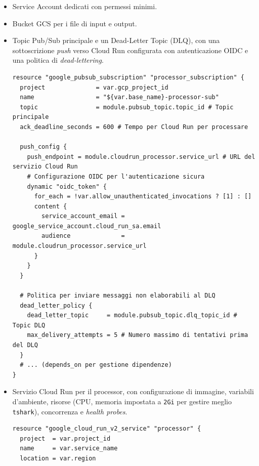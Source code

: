 \documentclass[11pt, a4paper]{article}
\begin{document}
\begin{itemize}
    \item Service Account dedicati con permessi minimi.
    \item Bucket GCS per i file di input e output.
    \item Topic Pub/Sub principale e un Dead-Letter Topic (DLQ), con una sottoscrizione \textit{push} verso Cloud Run configurata con autenticazione OIDC e una politica di \textit{dead-lettering}.
    \begin{lstlisting}[language=HCL, style=hclstyle, caption={Estratto da \texttt{terraform/main.tf}: Definizione della sottoscrizione Pub/Sub.}, label=lst:tf_pubsub_sub, basicstyle=\ttfamily\scriptsize]
resource "google_pubsub_subscription" "processor_subscription" {
  project              = var.gcp_project_id
  name                 = "${var.base_name}-processor-sub"
  topic                = module.pubsub_topic.topic_id # Topic principale
  ack_deadline_seconds = 600 # Tempo per Cloud Run per processare

  push_config {
    push_endpoint = module.cloudrun_processor.service_url # URL del servizio Cloud Run
    # Configurazione OIDC per l'autenticazione sicura
    dynamic "oidc_token" {
      for_each = !var.allow_unauthenticated_invocations ? [1] : []
      content {
        service_account_email = google_service_account.cloud_run_sa.email
        audience              = module.cloudrun_processor.service_url
      }
    }
  }

  # Politica per inviare messaggi non elaborabili al DLQ
  dead_letter_policy {
    dead_letter_topic     = module.pubsub_topic.dlq_topic_id # Topic DLQ
    max_delivery_attempts = 5 # Numero massimo di tentativi prima del DLQ
  }
  # ... (depends_on per gestione dipendenze)
}
    \end{lstlisting} 
    
    \item Servizio Cloud Run per il processor, con configurazione di immagine, variabili d'ambiente, risorse (CPU, memoria impostata a \texttt{2Gi} per gestire meglio \texttt{tshark}), concorrenza e \textit{health probes}.
    
    \begin{lstlisting}[language=HCL, style=hclstyle, caption={Estratto da \texttt{terraform/modules/cloudrun\_processor/main.tf}}, label=lst:tf_cloudrun_svc, basicstyle=\ttfamily\scriptsize]
resource "google_cloud_run_v2_service" "processor" {
  project  = var.project_id
  name     = var.service_name
  location = var.region


\end{lstlisting}
\end{itemize}
\end{document}
